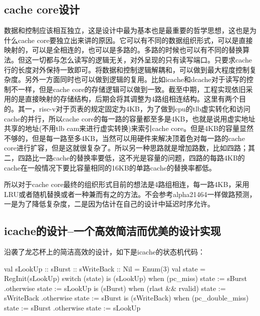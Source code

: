 \documentclass[11pt]{article}
\begin{document}
\subsection{cache core设计}
数据和控制应该相互独立，这是设计中最为基本也是最重要的哲学思想，这也是为什么cache core要独立出来讲的原因。它可以有不同的数据组织形式，可以是直接映射的，可以是全相连的，也可以是多路的。多路的时候也可以有不同的替换算法。但这一切都与怎么读写的逻辑无关，对外呈现的只有读写端口。只要求cache行的长度对外保持一致即可。将数据和控制逻辑解耦和，可以做到最大程度控制复杂度。另外一方面同时也可以做到逻辑的复用。比如icache和dcache对于读写的控制不一样，但是cache core的存储逻辑可以做到一致。截至中期，工程实现依旧采用的是直接映射的存储结构，后期会将其调整为4路组相连结构。这里有两个目的。其一，risc-v对于页表的规定固定为4KB，为了做到cpu的tlb虚实转化和访问cache的并行，所以cache core的每一路的容量都至多是4KB，也就是说用虚实地址共享的地址(不用tlb cam来进行虚实转换)来索引cache core。但是4KB的容量显然不够的，但是每一路至多4KB，当然可以用硬件来解决顶着色对每一路的cache core进行扩容，但是这就很复杂了。所以另一种思路就是增加路数，比如四路；其二，四路比一路cache的替换率要低，这不光是容量的问题，四路的每路4KB的cache在一般情况下要比容量相同的16KB的单路cache的替换率都低。

所以对于cache core最终的组织形式目前的想法是4路组相连，每一路4KB，采用LRU或者随机替换或者一种兼而有之的方法。不会参考alpha21464一样做路预测，一是为了降低复杂度，二是因为估计在自己的设计中延迟时序允许。
\subsection{icache的设计--一个高效简洁而优美的设计实现}
沿袭了龙芯杯上的简洁高效的设计，如下是icache的状态机代码：
\begin{scala}
	val sLookUp :: sBurst :: sWriteBack :: Nil = Enum(3)
	val state = RegInit(sLookUp)
	switch (state) {
		is (sLookUp) {
			when (pc_miss) { state := sBurst
			}.otherwise { state := sLookUp }
		}
		is (sBurst) {
			when (rlast && rvalid) { state := sWriteBack
			}.otherwise { state := sBurst }
		}
		is (sWriteBack) {
			when (pc_double_miss) { state := sBurst
			}.otherwise { state := sLookUp}
		}
	}
\end{scala}
\end{document}
